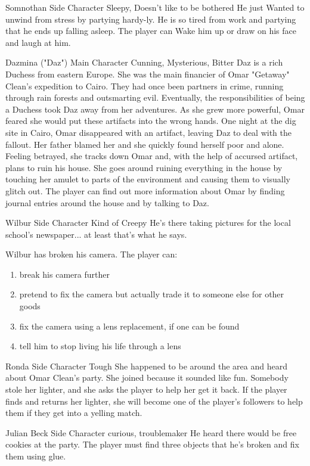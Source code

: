 {Somnothan}
{Side Character}
{Sleepy, Doesn't like to be bothered}
{He just Wanted to unwind from stress by partying hardy-ly. }
{He is so tired from work and partying that he ends up falling asleep. The player can Wake him up or draw on his face and laugh at him.}

{Dazmina ("Daz")}
{Main Character}
{Cunning, Mysterious, Bitter}
{Daz is a rich Duchess from eastern Europe. She was the main financier of Omar "Getaway" Clean's expedition to Cairo. They had once been partners in crime, running through rain forests and outsmarting evil. Eventually, the responsibilities of being a Duchess took Daz away from her adventures. As she grew more powerful, Omar feared she would put these artifacts into the wrong hands. One night at the dig site in Cairo, Omar disappeared with an artifact, leaving Daz to deal with the fallout. Her father blamed her and she quickly found herself poor and alone. Feeling betrayed, she tracks down Omar and, with the help of accursed artifact, plans to ruin his house.}
{She goes around ruining everything in the house by touching her amulet to parts of the environment and causing them to visually glitch out. The player can find out more information about Omar by finding journal entries around the house and by talking to Daz.}

{Wilbur}
{Side Character}
{Kind of Creepy}
{He's there taking pictures for the local school's newspaper... at least that's what he says.}
{Wilbur has broken his camera. The player can:
\begin{enumerate}
\item{break his camera further}
\item{pretend to fix the camera but actually trade it to someone else for other goods}
\item{fix the camera using a lens replacement, if one can be found}
\item{tell him to stop living his life through a lens}
\end{enumerate}
}

{Ronda}
{Side Character}
{Tough}
{She happened to be around the area and heard about Omar Clean's party. She joined because it sounded like fun.}
{Somebody stole her lighter, and she asks the player to help her get it back. If the player finds and returns her lighter, she will become one of the player's followers to help them if they get into a yelling match.
}

{Julian Beck}
{Side Character}
{curious, troublemaker}
{He heard there would be free cookies at the party.}
{The player must find three objects that he's broken and fix them using glue.}

